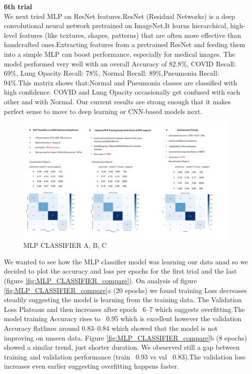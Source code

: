 \documentclass{article}
\begin{document}
\textbf{6th trial}\\
We next tried MLP on ResNet features.ResNet (Residual Networks) is a deep convolutional neural network pretrained on ImageNet.It learns hierarchical, high-level features (like textures, shapes, patterns) that are often more effective than handcrafted ones.Extracting features from a pretrained ResNet and feeding them into a simple MLP can boost performance, especially for medical images.
The model performed very well with an overall Accuracy of 82.8\%, COVID Recall: 69\%, Lung Opacity Recall: 78\%,    Normal Recall: 89\%,Pneumonia Recall: 94\%.This matrix shows that:Normal and Pneumonia classes are classified with high confidence. COVID and Lung Opacity occasionally get confused with each other and with Normal.
Our current results are strong enough that it makes perfect sense to move to deep learning or CNN-based models next.
\begin{figure}[ht] %
    \centering
    \includegraphics[width=1.0\linewidth]{mlpclassifier a,b,c.png}
    \caption{MLP CLASSIFIER A, B, C}
    \label{fig:MLP_CLASSIFIER}
\end{figure}
We wanted to see how the MLP classifier model was learning our data anad so we decided to plot the accuracy and loss per epochs for the first trial and the last (figure \ref{fig:MLP_CLASSIFIER_compare}). On analysis of figure \ref{fig:MLP_CLASSIFIER_compare}a (20 epochs) we found training Loss decreases steadily suggesting the model is learning from the training data.
The Validation Loss Plateaus and then increases after epoch ~6–7 which suggests overfitting.The model training Accuracy rises to ~0.95 which is excellent however the validation Accuracy flatlines around 0.83–0.84 which showed that the model is not improving on unseen data.
Figure \ref{fig:MLP_CLASSIFIER_compare}b (8 epochs) showed a similar trend, just shorter duration. We obeserved still a gap between training and validation performance (train ~0.93 vs val ~0.83).The validation loss increases even earlier suggesting overfitting happens faster.\\
\end{document}
